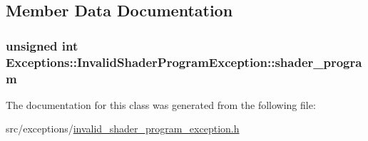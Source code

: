 \subsection{Member Data Documentation}
\hypertarget{class_exceptions_1_1_invalid_shader_program_exception_ad04a0590a5111a7267ca56dc595efb28}{}
\subsubsection[{shader\+\_\+program}]{\setlength{\rightskip}{0pt plus 5cm}unsigned int Exceptions\+::\+Invalid\+Shader\+Program\+Exception\+::shader\+\_\+program\hspace{0.3cm}{\ttfamily [private]}}\label{class_exceptions_1_1_invalid_shader_program_exception_ad04a0590a5111a7267ca56dc595efb28}


The documentation for this class was generated from the following file\+:\begin{DoxyCompactItemize}
\item 
src/exceptions/\hyperlink{invalid__shader__program__exception_8h}{invalid\+\_\+shader\+\_\+program\+\_\+exception.\+h}\end{DoxyCompactItemize}
